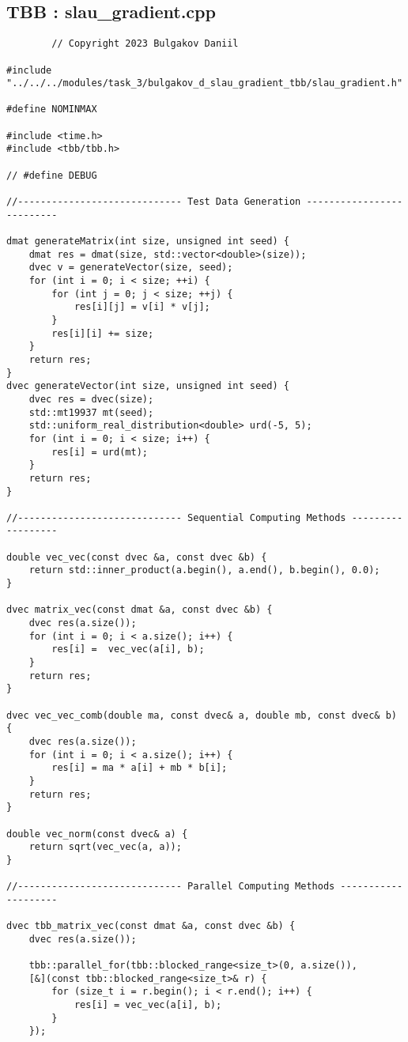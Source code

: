 \documentclass[14pt, russian]{extarticle}
\begin{document}
        \subsection{TBB : slau\_gradient.cpp}
        \begin{lstlisting}
        // Copyright 2023 Bulgakov Daniil

#include "../../../modules/task_3/bulgakov_d_slau_gradient_tbb/slau_gradient.h"

#define NOMINMAX

#include <time.h>
#include <tbb/tbb.h>

// #define DEBUG

//----------------------------- Test Data Generation --------------------------

dmat generateMatrix(int size, unsigned int seed) {
    dmat res = dmat(size, std::vector<double>(size));
    dvec v = generateVector(size, seed);
    for (int i = 0; i < size; ++i) {
        for (int j = 0; j < size; ++j) {
            res[i][j] = v[i] * v[j];
        }
        res[i][i] += size;
    }
    return res;
}
dvec generateVector(int size, unsigned int seed) {
    dvec res = dvec(size);
    std::mt19937 mt(seed);
    std::uniform_real_distribution<double> urd(-5, 5);
    for (int i = 0; i < size; i++) {
        res[i] = urd(mt);
    }
    return res;
}

//----------------------------- Sequential Computing Methods ------------------

double vec_vec(const dvec &a, const dvec &b) {
    return std::inner_product(a.begin(), a.end(), b.begin(), 0.0);
}

dvec matrix_vec(const dmat &a, const dvec &b) {
    dvec res(a.size());
    for (int i = 0; i < a.size(); i++) {
        res[i] =  vec_vec(a[i], b);
    }
    return res;
}

dvec vec_vec_comb(double ma, const dvec& a, double mb, const dvec& b) {
    dvec res(a.size());
    for (int i = 0; i < a.size(); i++) {
        res[i] = ma * a[i] + mb * b[i];
    }
    return res;
}

double vec_norm(const dvec& a) {
    return sqrt(vec_vec(a, a));
}

//----------------------------- Parallel Computing Methods --------------------

dvec tbb_matrix_vec(const dmat &a, const dvec &b) {
    dvec res(a.size());

    tbb::parallel_for(tbb::blocked_range<size_t>(0, a.size()),
    [&](const tbb::blocked_range<size_t>& r) {
        for (size_t i = r.begin(); i < r.end(); i++) {
            res[i] = vec_vec(a[i], b);
        }
    });


\end{lstlisting}
\end{document}
